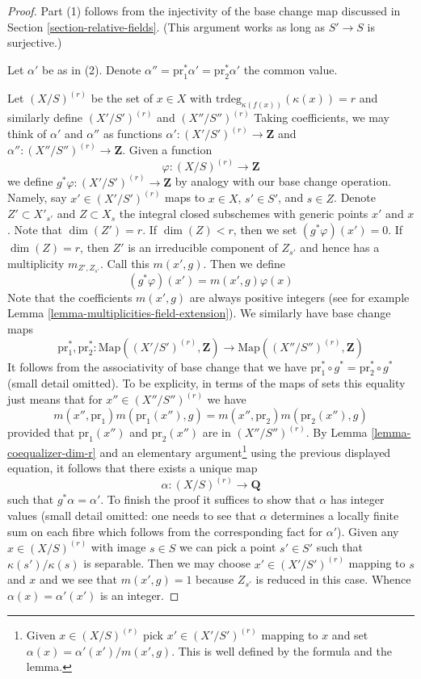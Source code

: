 \begin{proof}
Part (1) follows from the injectivity of the base change map discussed
in Section \ref{section-relative-fields}. (This argument works as
long as $S' \to S$ is surjective.)

\medskip\noindent
Let $\alpha'$ be as in (2). Denote
$\alpha'' = \text{pr}_1^*\alpha' = \text{pr}_2^*\alpha'$
the common value.

\medskip\noindent
Let $(X/S)^{(r)}$ be the set of $x \in X$ with
$\text{trdeg}_{\kappa(f(x))}(\kappa(x)) = r$
and similarly define $(X'/S')^{(r)}$ and $(X''/S'')^{(r)}$
Taking coefficients, we may think of $\alpha'$ and $\alpha''$ as functions
$\alpha' : (X'/S')^{(r)} \to \mathbf{Z}$ and
$\alpha'' : (X''/S'')^{(r)} \to \mathbf{Z}$.
Given a function
$$
\varphi : (X/S)^{(r)} \to \mathbf{Z}
$$
we define $g^*\varphi : (X'/S')^{(r)} \to \mathbf{Z}$ by analogy
with our base change operation. Namely, say $x' \in (X'/S')^{(r)}$
maps to $x \in X$, $s' \in S'$, and $s \in Z$.
Denote $Z' \subset X'_{s'}$ and $Z \subset X_s$ the integral
closed subschemes with generic points $x'$ and $x$. Note
that $\dim(Z') = r$. If $\dim(Z) < r$, then we set $(g^*\varphi)(x') = 0$.
If $\dim(Z) = r$, then $Z'$ is an irreducible component of $Z_{s'}$ and
hence has a multiplicity $m_{Z', Z_{s'}}$. Call this $m(x', g)$.
Then we define
$$
(g^*\varphi)(x') = m(x', g) \varphi(x)
$$
Note that the coefficients $m(x', g)$ are always positive integers
(see for example Lemma \ref{lemma-multiplicities-field-extension}).
We similarly have base change maps
$$
\text{pr}_1^*, \text{pr}_2^* :
\text{Map}((X'/S')^{(r)}, \mathbf{Z})
\longrightarrow
\text{Map}((X''/S'')^{(r)}, \mathbf{Z})
$$
It follows from the associativity of base change that we have
$\text{pr}_1^* \circ g^* = \text{pr}_2^* \circ g^*$ (small detail
omitted). To be explicity, in terms of the maps of sets this
equality just means that for $x'' \in (X''/S'')^{(r)}$ we have
$$
m(x'', \text{pr}_1) m(\text{pr}_1(x''), g) =
m(x'', \text{pr}_2) m(\text{pr}_2(x''), g)
$$
provided that $\text{pr}_1(x'')$ and $\text{pr}_2(x'')$ are
in $(X''/S'')^{(r)}$.
By Lemma \ref{lemma-coequalizer-dim-r} and an elementary
argument\footnote{Given $x \in (X/S)^{(r)}$ pick $x' \in (X'/S')^{(r)}$
mapping to $x$ and set $\alpha(x) = \alpha'(x')/m(x', g)$. This
is well defined by the formula and the lemma.}
using the previous displayed equation,
it follows that there exists a unique map
$$
\alpha : (X/S)^{(r)} \to \mathbf{Q}
$$
such that $g^*\alpha = \alpha'$. To finish the proof it suffices
to show that $\alpha$ has integer values (small detail omitted: one
needs to see that $\alpha$ determines a locally finite sum on
each fibre which follows from the corresponding fact for $\alpha'$).
Given any $x \in (X/S)^{(r)}$ with image $s \in S$
we can pick a point $s' \in S'$ such that $\kappa(s')/\kappa(s)$
is separable. Then we may choose $x' \in (X'/S')^{(r)}$ mapping
to $s$ and $x$ and we see that $m(x', g) = 1$ because
$Z_{s'}$ is reduced in this case. Whence $\alpha(x) = \alpha'(x')$
is an integer.
\end{proof}

